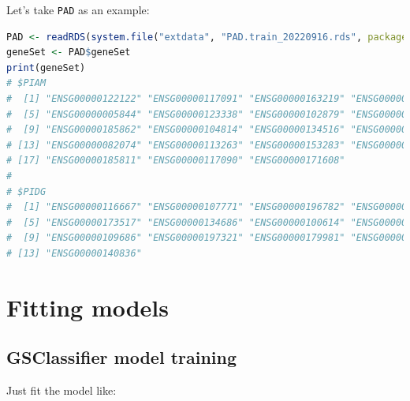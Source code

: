 \documentclass[
  12pt,
]{book}
\newcommand{\passthrough}[1]{#1}
\begin{document}
Let's take \passthrough{\lstinline!PAD!} as an example:

\begin{lstlisting}[language=R]
PAD <- readRDS(system.file("extdata", "PAD.train_20220916.rds", package = "GSClassifier"))
geneSet <- PAD$geneSet
print(geneSet)
# $PIAM
#  [1] "ENSG00000122122" "ENSG00000117091" "ENSG00000163219" "ENSG00000136167"
#  [5] "ENSG00000005844" "ENSG00000123338" "ENSG00000102879" "ENSG00000010671"
#  [9] "ENSG00000185862" "ENSG00000104814" "ENSG00000134516" "ENSG00000100055"
# [13] "ENSG00000082074" "ENSG00000113263" "ENSG00000153283" "ENSG00000198821"
# [17] "ENSG00000185811" "ENSG00000117090" "ENSG00000171608"
# 
# $PIDG
#  [1] "ENSG00000116667" "ENSG00000107771" "ENSG00000196782" "ENSG00000271447"
#  [5] "ENSG00000173517" "ENSG00000134686" "ENSG00000100614" "ENSG00000134247"
#  [9] "ENSG00000109686" "ENSG00000197321" "ENSG00000179981" "ENSG00000187189"
# [13] "ENSG00000140836"
\end{lstlisting}

\hypertarget{fitting-models}{%
\section{Fitting models}\label{fitting-models}}

\hypertarget{gsclassifier-model-training}{%
\subsection{GSClassifier model training}\label{gsclassifier-model-training}}

Just fit the model like:
\end{document}
